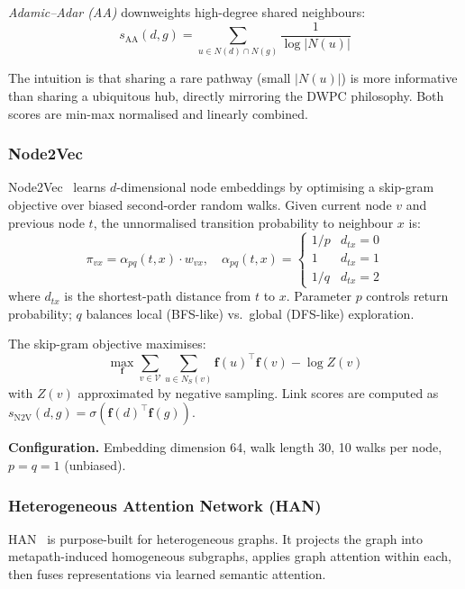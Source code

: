 \documentclass{article}
\newcommand{\Vcal}{\mathcal{V}}
\DeclareMathOperator{\AAd}{AA}
\begin{document}
\textit{Adamic--Adar (AA)} downweights high-degree shared neighbours:
\begin{equation}
s_{\AAd}(d,g) = \sum_{u \in N(d) \cap N(g)} \frac{1}{\log |N(u)|}
\label{eq:aa}
\end{equation}

The intuition is that sharing a rare pathway (small $|N(u)|$) is more informative than sharing a ubiquitous hub, directly mirroring the DWPC philosophy. Both scores are min-max normalised and linearly combined.

\subsubsection{Node2Vec}

Node2Vec~\citep{grover2016node2vec} learns $d$-dimensional node embeddings by optimising a skip-gram objective over biased second-order random walks. Given current node $v$ and previous node $t$, the unnormalised transition probability to neighbour $x$ is:
\begin{equation}
\pi_{vx} = \alpha_{pq}(t,x)\cdot w_{vx},\quad
\alpha_{pq}(t,x) = \begin{cases}
1/p & d_{tx}=0 \\ 1 & d_{tx}=1 \\ 1/q & d_{tx}=2
\end{cases}
\end{equation}
where $d_{tx}$ is the shortest-path distance from $t$ to $x$. Parameter $p$ controls return probability; $q$ balances local (BFS-like) vs.\ global (DFS-like) exploration.

The skip-gram objective maximises:
\begin{equation}
\max_\mathbf{f} \sum_{v\in\Vcal}\sum_{u\in N_S(v)} \mathbf{f}(u)^\top\mathbf{f}(v) - \log Z(v)
\end{equation}
with $Z(v)$ approximated by negative sampling. Link scores are computed as $s_{\text{N2V}}(d,g) = \sigma(\mathbf{f}(d)^\top\mathbf{f}(g))$.

\textbf{Configuration.} Embedding dimension 64, walk length 30, 10 walks per node, $p=q=1$ (unbiased).

\subsubsection{Heterogeneous Attention Network (HAN)}

HAN~\citep{wang2019han} is purpose-built for heterogeneous graphs. It projects the graph into metapath-induced homogeneous subgraphs, applies graph attention within each, then fuses representations via learned semantic attention.
\end{document}
